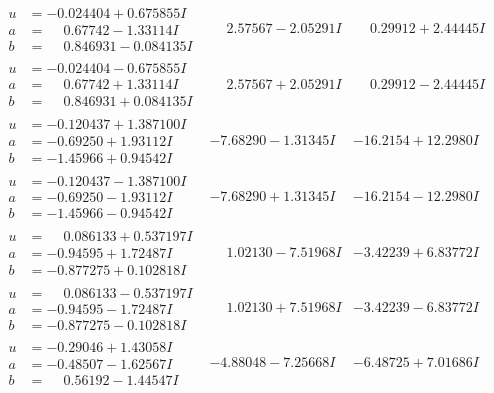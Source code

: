 \documentclass[1p]{elsarticle_modified}
\theoremstyle{definition}
\begin{document}
$$\begin{array}{c|c|c}
\begin{aligned}
u &= -0.024404 + 0.675855 I \\
a &= \phantom{-}0.67742 - 1.33114 I \\
b &= \phantom{-}0.846931 - 0.084135 I\end{aligned}
 & \phantom{-}2.57567 - 2.05291 I & \phantom{-}0.29912 + 2.44445 I \\ \hline\begin{aligned}
u &= -0.024404 - 0.675855 I \\
a &= \phantom{-}0.67742 + 1.33114 I \\
b &= \phantom{-}0.846931 + 0.084135 I\end{aligned}
 & \phantom{-}2.57567 + 2.05291 I & \phantom{-}0.29912 - 2.44445 I \\ \hline\begin{aligned}
u &= -0.120437 + 1.387100 I \\
a &= -0.69250 + 1.93112 I \\
b &= -1.45966 + 0.94542 I\end{aligned}
 & -7.68290 - 1.31345 I & -16.2154 + 12.2980 I \\ \hline\begin{aligned}
u &= -0.120437 - 1.387100 I \\
a &= -0.69250 - 1.93112 I \\
b &= -1.45966 - 0.94542 I\end{aligned}
 & -7.68290 + 1.31345 I & -16.2154 - 12.2980 I \\ \hline\begin{aligned}
u &= \phantom{-}0.086133 + 0.537197 I \\
a &= -0.94595 + 1.72487 I \\
b &= -0.877275 + 0.102818 I\end{aligned}
 & \phantom{-}1.02130 - 7.51968 I & -3.42239 + 6.83772 I \\ \hline\begin{aligned}
u &= \phantom{-}0.086133 - 0.537197 I \\
a &= -0.94595 - 1.72487 I \\
b &= -0.877275 - 0.102818 I\end{aligned}
 & \phantom{-}1.02130 + 7.51968 I & -3.42239 - 6.83772 I \\ \hline\begin{aligned}
u &= -0.29046 + 1.43058 I \\
a &= -0.48507 - 1.62567 I \\
b &= \phantom{-}0.56192 - 1.44547 I\end{aligned}
 & -4.88048 - 7.25668 I & -6.48725 + 7.01686 I \\ \hline\begin{aligned}

\end{aligned}
\end{array}$$
\end{document}
